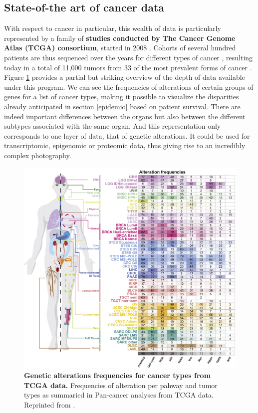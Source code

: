 \documentclass[a4paper,12pt,twoside,onecolumn,openright,final,oldfontcommands]{memoir}
\begin{document}
\subsection{State-of-the art of cancer
data}\label{state-of-the-art-of-cancer-data}

With respect to cancer in particular, this wealth of data is
particularly represented by a family of \textbf{studies conducted by The
Cancer Genome Atlas (TCGA) consortium}, started in 2008
\citep{cancer2008comprehensive}. Cohorts of several hundred patients are
thus sequenced over the years for different types of cancer
\citep{cancer2012comprehensive}, resulting today in a total of 11,000
tumors from 33 of the most prevalent forms of cancer
\citep{ding2018perspective}. Figure \ref{fig:tcga} provides a partial
but striking overview of the depth of data available under this program.
We can see the frequencies of alterations of certain groups of genes for
a list of cancer types, making it possible to visualize the disparities
already anticipated in section \ref{epidemio} based on patient survival.
There are indeed important differences between the organs but also
between the different subtypes associated with the same organ. And this
representation only corresponds to one layer of data, that of genetic
alterations. It could be used for transcriptomic, epigenomic or
proteomic data, thus giving rise to an incredibly complex photography.

\begin{figure}

{\centering \includegraphics[width=0.9\linewidth]{fig/tcga} 

}

\caption[Genetic alterations frequencies for cancer types from TCGA data]{\textbf{Genetic alterations frequencies for cancer
types from TCGA data.} Frequencies of alteration per pahway and tumor
types as summaried in Pan-cancer analyses from TCGA data. Reprinted from
\citet{sanchez2018oncogenic}.}\label{fig:tcga}
\end{figure}
\end{document}
